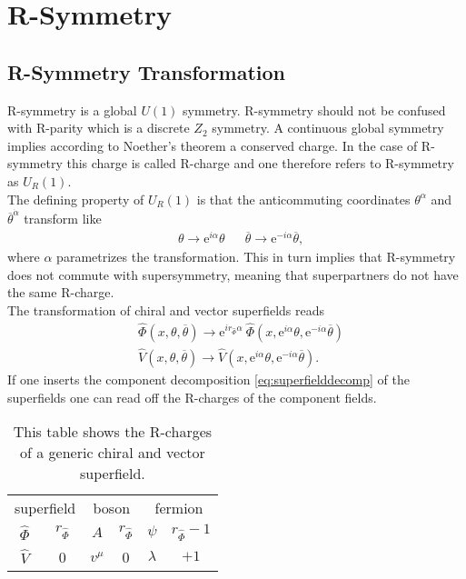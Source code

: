 \section{R-Symmetry}
\subsection{R-Symmetry Transformation}
R-symmetry is a global $U(1)$ symmetry. R-symmetry should not be confused with R-parity which is a discrete $Z_2$ symmetry. A continuous global symmetry implies according to Noether's theorem a conserved charge. In the case of R-symmetry this charge is called R-charge and one therefore refers to R-symmetry as $U_R(1)$.\\
The defining property of $U_R(1)$ is that the anticommuting coordinates $\theta^\alpha$ and $\overline{\theta}^{\dot{\alpha}}$ transform like
\begin{align}
&\theta \to \mathrm{e}^{i\alpha}\theta && \overline{\theta} \to \mathrm{e}^{-i\alpha}\overline{\theta},
\end{align}
where $\alpha$ parametrizes the transformation. This in turn implies that R-symmetry does not commute with supersymmetry, meaning that superpartners do not have the same R-charge.\\
The transformation of chiral and vector superfields reads
\begin{align}
& \hat{\Phi}(x,\theta,\overline{\theta}) \to \mathrm{e}^{ir_{\hat{\Phi}}\alpha}\ \hat{\Phi}(x,\mathrm{e}^{i\alpha}\theta,\mathrm{e}^{-i\alpha}\overline{\theta})\nonumber\\
&\hat{V}(x,\theta,\overline{\theta}) \to  \hat{V}(x,\mathrm{e}^{i\alpha}\theta,\mathrm{e}^{-i\alpha}\overline{\theta}).
\end{align}
If one inserts the component decomposition \ref{eq:superfielddecomp} of the superfields one can read off the R-charges of the component fields.
\begin{table}
\begin{center}
\begin{tabular}{c|c||c|c||c|c}
\multicolumn{2}{c||}{superfield} & \multicolumn{2}{c||}{boson} & \multicolumn{2}{c}{fermion} \\
\hhline{=|=#=|=#=|=}
$\hat{\Phi}$ & $r_{\hat{\Phi}}$ & $A$ & $r_{\hat{\Phi}}$ & $\psi$ & $r_{\hat{\Phi}}-1$\\
$\hat{V}$ & 0 & $v^\mu$ & 0 & $\lambda$ & $+1$
\end{tabular}
\caption{This table shows the R-charges of a generic chiral and vector superfield.}
\end{center}
\end{table}





